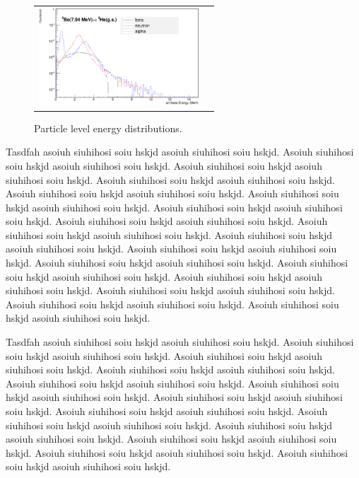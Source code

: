 \documentclass{JINST}
\begin{document}
\begin{figure}[htp]
\begin{tabular}{cc}
    \includegraphics[width=60mm]{a_n_beta_spect_c7.eps}\\
   
  \end{tabular}
\label{figur}\caption{ Particle level energy distributions.}
\end{figure}
        Tasdfah asoiuh siuhihosi soiu hskjd asoiuh siuhihosi soiu
hskjd. Asoiuh siuhihosi soiu hskjd asoiuh siuhihosi soiu hskjd. Asoiuh
siuhihosi soiu hskjd asoiuh siuhihosi soiu hskjd.  Asoiuh siuhihosi
soiu hskjd asoiuh siuhihosi soiu hskjd. Asoiuh siuhihosi soiu hskjd
asoiuh siuhihosi soiu hskjd. Asoiuh siuhihosi soiu hskjd asoiuh
siuhihosi soiu hskjd. Asoiuh siuhihosi soiu hskjd asoiuh siuhihosi
soiu hskjd. Asoiuh siuhihosi soiu hskjd asoiuh siuhihosi soiu hskjd.
Asoiuh siuhihosi soiu hskjd asoiuh siuhihosi soiu hskjd. Asoiuh
siuhihosi soiu hskjd asoiuh siuhihosi soiu hskjd. Asoiuh siuhihosi
soiu hskjd asoiuh siuhihosi soiu hskjd. Asoiuh siuhihosi soiu hskjd
asoiuh siuhihosi soiu hskjd. Asoiuh siuhihosi soiu hskjd asoiuh
siuhihosi soiu hskjd.  Asoiuh siuhihosi soiu hskjd asoiuh siuhihosi
soiu hskjd. Asoiuh siuhihosi soiu hskjd asoiuh siuhihosi soiu
hskjd. Asoiuh siuhihosi soiu hskjd asoiuh siuhihosi soiu hskjd. Asoiuh
siuhihosi soiu hskjd asoiuh siuhihosi soiu hskjd.



        Tasdfah asoiuh siuhihosi soiu hskjd asoiuh siuhihosi soiu
hskjd. Asoiuh siuhihosi soiu hskjd asoiuh siuhihosi soiu hskjd. Asoiuh
siuhihosi soiu hskjd asoiuh siuhihosi soiu hskjd.  Asoiuh siuhihosi
soiu hskjd asoiuh siuhihosi soiu hskjd. Asoiuh siuhihosi soiu hskjd
asoiuh siuhihosi soiu hskjd. Asoiuh siuhihosi soiu hskjd asoiuh
siuhihosi soiu hskjd. Asoiuh siuhihosi soiu hskjd asoiuh siuhihosi
soiu hskjd. Asoiuh siuhihosi soiu hskjd asoiuh siuhihosi soiu hskjd.
Asoiuh siuhihosi soiu hskjd asoiuh siuhihosi soiu hskjd. Asoiuh
siuhihosi soiu hskjd asoiuh siuhihosi soiu hskjd. Asoiuh siuhihosi
soiu hskjd asoiuh siuhihosi soiu hskjd. Asoiuh siuhihosi soiu hskjd
asoiuh siuhihosi soiu hskjd. Asoiuh siuhihosi soiu hskjd asoiuh
siuhihosi soiu hskjd. 
\end{document}
